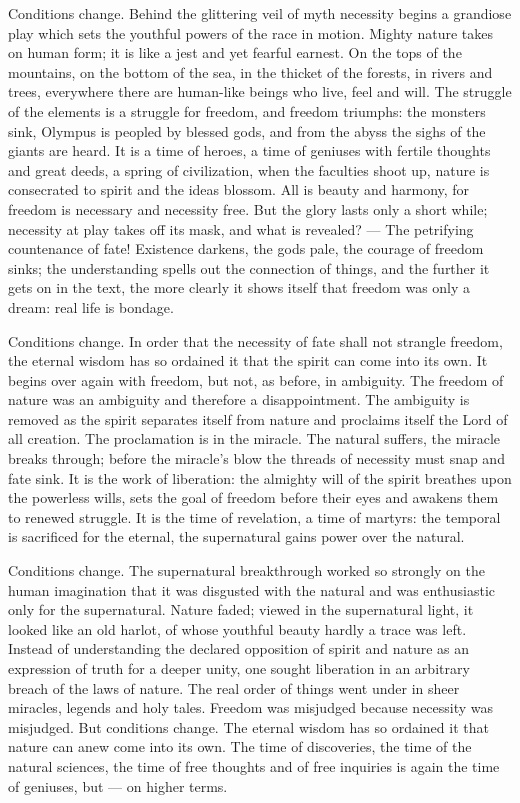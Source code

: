 \documentclass[12pt,a4paper,openany]{book}
\newcommand{\opage}[1]{\marginnote{\footnotesize\textit{[#1]}}}
\begin{document}
Conditions change. Behind the glittering veil of myth
necessity begins a grandiose play which sets
the youthful powers of the race in motion. Mighty
nature takes on human form; it is like
a jest and yet fearful earnest. On the tops of the mountains,
on the bottom of the sea, in the thicket of the forests, in rivers and
trees, everywhere there are human-like beings who
live, feel and will. The struggle of the elements is a struggle for freedom,
and freedom triumphs: the monsters sink, Olympus
is peopled by blessed gods, and from the abyss the sighs of the giants
are heard. It is a time of heroes, a time of geniuses
with fertile thoughts and great deeds, a
spring of civilization, when the faculties shoot up, nature
is consecrated to spirit and the ideas blossom. All is
beauty and harmony, for freedom is necessary and
necessity free. But the glory lasts only a short while;
necessity at play takes off its mask, and what
is revealed? --- The petrifying countenance of fate! Existence
darkens, the gods pale, the courage of freedom sinks; the understanding
spells out the connection of things, and the further
it gets on in the text, the more clearly it shows
itself that freedom was only a dream: real life
is bondage.

\setcounter{footnote}{0}%
\opage{18}Conditions change. In order that the necessity of fate
shall not strangle freedom, the eternal wisdom has so ordained
it that the spirit can come into its own. It begins
over again with freedom, but not, as before, in ambiguity.
The freedom of nature was an ambiguity and therefore
a disappointment. The ambiguity is removed as the spirit separates
itself from nature and proclaims itself the Lord of all creation.
The proclamation is in the miracle. The natural suffers,
the miracle breaks through; before the miracle's blow the threads of necessity
must snap and fate sink. It is
the work of liberation: the almighty will of the spirit breathes
upon the powerless wills, sets the goal of freedom before
their eyes and awakens them to renewed struggle. It is the time of
revelation, a time of martyrs: the temporal is sacrificed
for the eternal, the supernatural gains power over
the natural.

Conditions change. The supernatural breakthrough
worked so strongly on the human imagination that
it was disgusted with the natural and was enthusiastic only for
the supernatural. Nature faded; viewed
in the supernatural light, it looked like an old
harlot, of whose youthful beauty hardly a trace was
left. Instead of understanding the declared opposition
of spirit and nature as an expression of truth for a deeper
unity, one sought liberation in an arbitrary breach of
the laws of nature. The real order of things went
under in sheer miracles, legends and holy tales.
Freedom was misjudged because necessity was
misjudged. But conditions change. The eternal wisdom
has so ordained it that nature can anew come
into its own. The time of discoveries, the time of the natural sciences,
\setcounter{footnote}{0}%
\opage{19}the time of free thoughts and of free inquiries is
again the time of geniuses, but --- on higher terms.
\end{document}
